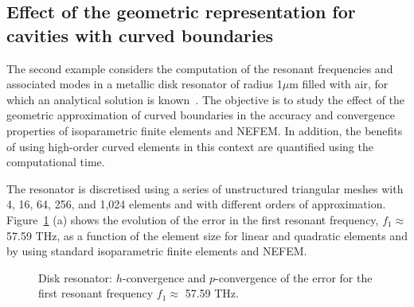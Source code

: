 \subsection{Effect of the geometric representation for cavities with curved boundaries}
The second example considers the computation of the resonant frequencies and associated modes in a metallic disk resonator of radius 1$\mu$m filled with air, for which an analytical solution is known~\cite{BalanisBook}. The objective is to study the effect of the geometric approximation of curved boundaries in the accuracy and convergence properties of isoparametric finite elements and NEFEM. In addition, the benefits of using high-order curved elements in this context are quantified using the computational time. 

The resonator is discretised using a series of unstructured triangular meshes with 4, 16, 64, 256, and 1,024 elements and with different orders of approximation. Figure~\ref{fig:circleFEMvsNEFEM_Convergence} (a) shows the evolution of the error in the first resonant frequency, $f_1 \approx$ 57.59 THz, as a function of the element size for linear and quadratic elements and by using standard isoparametric finite elements and NEFEM. 
\begin{figure}[!ht]
	\centering
	\caption{Disk resonator: $h$-convergence and $p$-convergence of the error for the first resonant frequency $f_1 \approx$ 57.59 THz.}
	\label{fig:circleFEMvsNEFEM_Convergence}
\end{figure}
